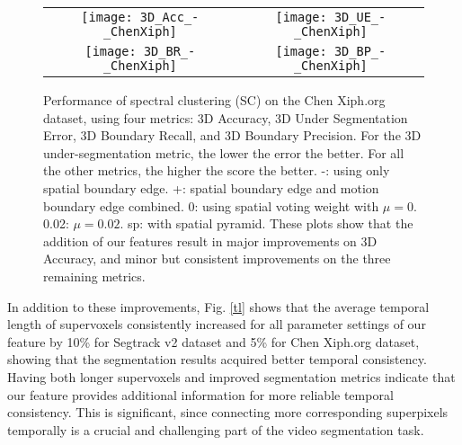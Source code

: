 \documentclass[runningheads]{llncs}
\begin{document}
\begin{figure}[!t]
\begin{center}
\begin{adjustbox}{max width=0.9\textwidth }
\begin{tabular}{cc}
\texttt{[image: 3D\_Acc\_-\_ChenXiph]}&
\texttt{[image: 3D\_UE\_-\_ChenXiph]}\\
\texttt{[image: 3D\_BR\_-\_ChenXiph]}&
\texttt{[image: 3D\_BP\_-\_ChenXiph]}\\
\end{tabular}
\end{adjustbox}
\end{center}
\caption{Performance of spectral clustering (SC) \cite{Galasso2013} on the Chen Xiph.org dataset, using four metrics: 3D Accuracy, 3D Under Segmentation Error, 3D Boundary Recall, and 3D Boundary Precision. For the 3D under-segmentation metric, the lower the error the better. For all the other metrics, the higher the score the better. -: using only spatial boundary edge. +: spatial boundary edge and motion boundary edge combined. 0: using spatial voting weight with $\mu =0$. 0.02: $\mu =0.02$. sp: with spatial pyramid. These plots show that the addition of our features result in major improvements on 3D Accuracy, and minor but consistent improvements on the three remaining metrics.}
\label{VSS_chen}
\end{figure}

In addition to these improvements, Fig. \ref{tl} shows that the average temporal length of supervoxels consistently increased for all parameter settings of our feature by 10\% for Segtrack v2 dataset and 5\% for Chen Xiph.org dataset, showing that the segmentation results acquired better temporal consistency. Having both longer supervoxels and improved segmentation metrics indicate that our feature provides additional information for more reliable temporal consistency. This is significant, since connecting more corresponding superpixels temporally is a crucial and challenging part of the video segmentation task.
\end{document}
